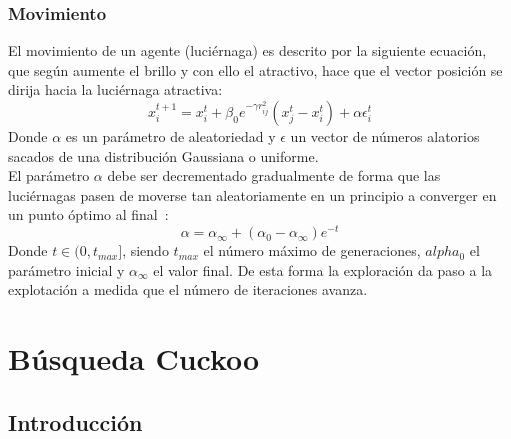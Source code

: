 \subsubsection{Movimiento}
El movimiento de un agente (luciérnaga) es descrito por la siguiente ecuación, que según aumente el brillo y con ello el atractivo, hace que el vector posición se dirija hacia la luciérnaga atractiva:
\begin{equation}
    x_i^{t+1} = x_i^t + \beta_0e^{-\gamma r_{ij}^2}(x_j^t-x_i^t)+\alpha\epsilon_i^t
\end{equation}
Donde $\alpha$ es un parámetro de aleatoriedad y $\epsilon$ un vector de números alatorios sacados de una distribución Gaussiana o uniforme. \\[6pt]
El parámetro $\alpha$ debe ser decrementado gradualmente de forma que las luciérnagas pasen de moverse tan aleatoriamente en un principio a converger en un punto óptimo al final~\cite{yang_chapter_2014}:
\begin{equation}
    \alpha = \alpha_\infty + (\alpha_0-\alpha_\infty)e^{-t}
\end{equation}
Donde $t\in(0,t_{max}]$, siendo $t_{max}$ el número máximo de generaciones, $alpha_0$ el parámetro inicial y $\alpha_\infty$ el valor final. De esta forma la exploración da paso a la explotación a medida que el número de iteraciones avanza.

\section{Búsqueda Cuckoo}
\subsection{Introducción}